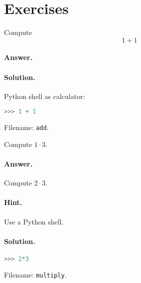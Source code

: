 \documentclass[graybox,sectrefs,envcountresetchap,open=right,final]{svmonodo}
\makeatletter
\newenvironment{doconceexercise}{}{}
\newcounter{doconceexercisecounter}%
\newcommand\listofexercises{
\chapter*{List of Problems
          \@mkboth{List of Problems}{List of Problems}}
\markboth{List of Problems}{List of Problems}
\@starttoc{loe}
}
\makeatother
\begin{document}
\section{Exercises}
\begin{doconceexercise}
                
\label{exer:add}
Compute
\[ 1 + 1 \]
\paragraph{Answer.}

\paragraph{Solution.}
Python shell as calculator:
\begin{lstlisting}[language=Python,style=simple,xleftmargin=2mm]
>>> 1 + 1


\end{lstlisting}

\noindent Filename: \texttt{add}.
\end{doconceexercise}
\begin{doconceexercise}
                
\label{exer:mul}
Compute $1\cdot 3$.
\paragraph{Answer.}

Compute $2\cdot 3$.
\paragraph{Hint.}
Use a Python shell.
\paragraph{Solution.}
\begin{lstlisting}[language=Python,style=simple,xleftmargin=2mm]
>>> 2*3


\end{lstlisting}

\noindent Filename: \texttt{multiply}.
\end{doconceexercise}
\appendix
\end{document}
